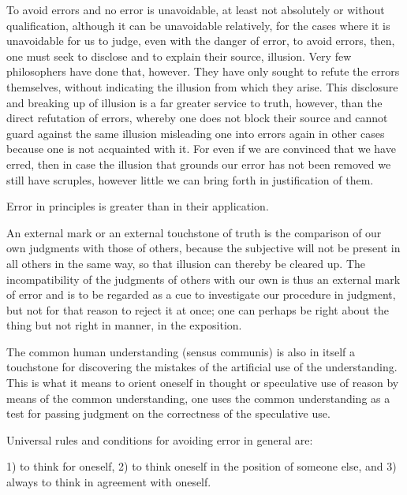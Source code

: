         To avoid errors and no error is unavoidable,
        at least not absolutely or without qualification,
        although it can be unavoidable relatively,
        for the cases where it is unavoidable for us to judge,
        even with the danger of error,
        to avoid errors, then, one must seek to
        disclose and to explain their source, illusion.
        Very few philosophers have done that, however.
        They have only sought to refute the errors themselves,
        without indicating the illusion from which they arise.
        This disclosure and breaking up of illusion is
        a far greater service to truth, however, than the direct refutation
        of errors, whereby one does not block their source and cannot guard
        against the same illusion misleading one into errors again in other cases
        because one is not acquainted with it.
        For even if we are convinced that we have erred,
        then in case the illusion that grounds our error
        has not been removed we still have scruples,
        however little we can bring forth in justification of them.

    Error in principles is greater than in their application.

    An external mark or an external touchstone of truth is
    the comparison of our own judgments with those of others,
    because the subjective will not be present in all others in the same way,
    so that illusion can thereby be cleared up.
    The incompatibility of the judgments of others with our own is
    thus an external mark of error and is to be regarded as a cue to investigate
    our procedure in judgment, but not for that reason to reject it at once;
    one can perhaps be right about the thing but not right in manner,
    in the exposition.

    The common human understanding (sensus communis) is also in itself
    a touchstone for discovering the mistakes of the artificial use
    of the understanding.
    This is what it means to orient oneself in thought or
    speculative use of reason by means of the common understanding,
    one uses the common understanding as a test for passing judgment
    on the correctness of the speculative use.

    Universal rules and conditions for avoiding error in general are:

    1) to think for oneself,
    2) to think oneself in the position of someone else, and
    3) always to think in agreement with oneself.

